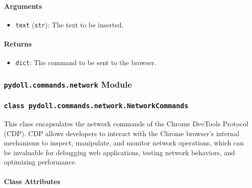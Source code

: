 \documentclass{article}
\begin{document}
\paragraph{Arguments}

\begin{itemize}
    \item \lstinline[style=pythonstyle]|text| (\lstinline[style=pythonstyle]|str|): The text to be inserted.
\end{itemize}

\paragraph{Returns}

\begin{itemize}
    \item \lstinline[style=pythonstyle]|dict|: The command to be sent to the browser.
\end{itemize}

\subsubsection*{\texttt{pydoll.commands.network} Module}

\subsubsection*{\texttt{class pydoll.commands.network.NetworkCommands}}
\noindent This class encapsulates the network commands of the Chrome DevTools Protocol (CDP). CDP allows developers to interact with the Chrome browser's internal mechanisms to inspect, manipulate, and monitor network operations, which can be invaluable for debugging web applications, testing network behaviors, and optimizing performance.

\paragraph{Class Attributes}
\end{document}
